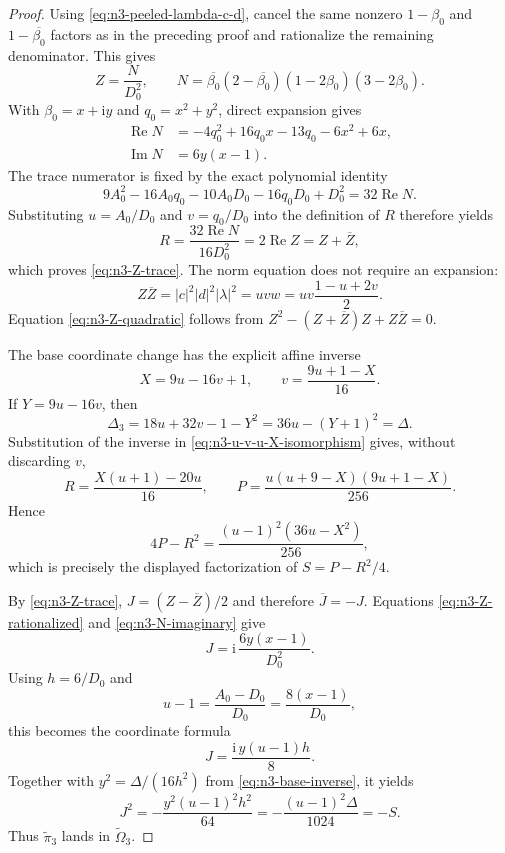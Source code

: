 \begin{proof}
Using \eqref{eq:n3-peeled-lambda-c-d}, cancel the same nonzero
$1-\beta_0$ and $1-\overline{\beta_0}$ factors as in the preceding proof and
rationalize the remaining denominator.  This gives
\begin{equation}
 Z=\frac{N}{D_0^2},\qquad
 N=\overline{\beta_0}(2-\overline{\beta_0})
 (1-2\beta_0)(3-2\beta_0).
 \label{eq:n3-Z-rationalized}
\end{equation}
With $\beta_0=x+\mathrm i y$ and $q_0=x^2+y^2$, direct expansion gives
\begin{align}
 \operatorname{Re}N
 &=-4q_0^2+16q_0x-13q_0-6x^2+6x,
 \label{eq:n3-N-real}\\
 \operatorname{Im}N&=6y(x-1).
 \label{eq:n3-N-imaginary}
\end{align}
The trace numerator is fixed by the exact polynomial identity
\begin{equation}
 9A_0^2-16A_0q_0-10A_0D_0-16q_0D_0+D_0^2
 =32\operatorname{Re}N.
 \label{eq:n3-trace-polynomial-identity}
\end{equation}
Substituting $u=A_0/D_0$ and $v=q_0/D_0$ into the definition of $R$ therefore
yields
\[
 R=\frac{32\operatorname{Re}N}{16D_0^2}
 =2\operatorname{Re}Z=Z+\overline Z,
\]
which proves \eqref{eq:n3-Z-trace}.  The norm equation does not require an
expansion:
\[
 Z\overline Z=|c|^2|d|^2|\lambda|^2=uvw
 =uv\frac{1-u+2v}{2}.
\]
Equation \eqref{eq:n3-Z-quadratic} follows from
$Z^2-(Z+\overline Z)Z+Z\overline Z=0$.

The base coordinate change has the explicit affine inverse
\begin{equation}
 X=9u-16v+1,\qquad
 v=\frac{9u+1-X}{16}.
 \label{eq:n3-u-v-u-X-isomorphism}
\end{equation}
If $Y=9u-16v$, then
\[
 \Delta_3=18u+32v-1-Y^2
 =36u-(Y+1)^2=\Delta.
\]
Substitution of the inverse in \eqref{eq:n3-u-v-u-X-isomorphism} gives, without
discarding $v$,
\begin{equation}
 R=\frac{X(u+1)-20u}{16},
 \qquad
 P=\frac{u(u+9-X)(9u+1-X)}{256}.
 \label{eq:n3-R-P-in-u-X}
\end{equation}
Hence
\begin{equation}
 4P-R^2=\frac{(u-1)^2(36u-X^2)}{256},
 \label{eq:n3-S-factorization-step}
\end{equation}
which is precisely the displayed factorization of $S=P-R^2/4$.

By \eqref{eq:n3-Z-trace}, $J=(Z-\overline Z)/2$ and therefore
$\overline J=-J$.  Equations \eqref{eq:n3-Z-rationalized} and
\eqref{eq:n3-N-imaginary} give
\[
 J=\mathrm i\,\frac{6y(x-1)}{D_0^2}.
\]
Using $h=6/D_0$ and
\[
 u-1=\frac{A_0-D_0}{D_0}=\frac{8(x-1)}{D_0},
\]
this becomes the coordinate formula
\begin{equation}
 J=\frac{\mathrm i\,y(u-1)h}{8}.
 \label{eq:n3-J-y-coordinate}
\end{equation}
Together with $y^2=\Delta/(16h^2)$ from
\eqref{eq:n3-base-inverse}, it yields
\[
 J^2=-\frac{y^2(u-1)^2h^2}{64}
 =-\frac{(u-1)^2\Delta}{1024}=-S.
\]
Thus $\widetilde\pi_3$ lands in $\widetilde\Omega_3$.


\end{proof}

